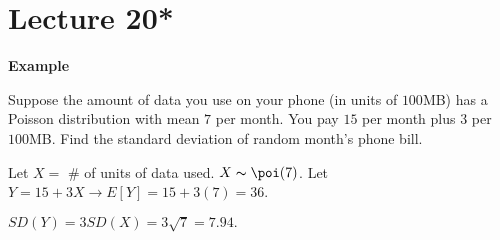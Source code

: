 \section{Lecture 20*}
\textbf{Example}

Suppose the amount of data you use on your phone (in units of $ 100 $MB) has
a Poisson distribution with mean $ 7 $ per month. You pay $ 15 $ per
month plus $ 3 $ per $ 100 $MB. Find the standard deviation of random
month's phone bill.

Let $ X= $ \# of units of data used. $ X \thicksim \poi(7) $. Let
$ Y=15+3X\rightarrow E[Y]=15+3(7)=36 $. 

$ SD(Y)=3SD(X)=3\sqrt{7}=7.94. $
